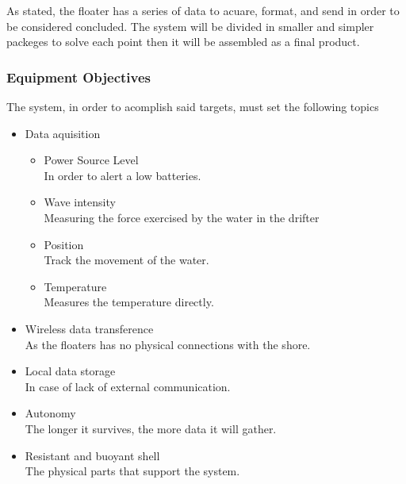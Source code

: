 As stated, the floater has a series of data to acuare, format, and send in order to 
be considered concluded. The system will be divided in smaller and simpler packeges to solve
each point then it will be assembled as a final product.

\subsubsection{Equipment Objectives}
The system, in order to acomplish said targets, must set the following topics

\begin{itemize}
    \item Data aquisition
    \begin{itemize}
        \item Power Source Level \\ In order to alert a low batteries.
        \item Wave intensity \\ Measuring the force exercised by the water in the drifter
        \item Position \\ Track the movement of the water.
        \item Temperature \\ Measures the temperature directly.
    \end{itemize}
    \item Wireless data transference \\ As the floaters has no physical connections with the shore. 
    \item Local data storage \\ In case of lack of external communication.
    \item Autonomy \\ The longer it survives, the more data it will gather.
    \item Resistant and buoyant shell \\ The physical parts that support the system.
\end{itemize}





